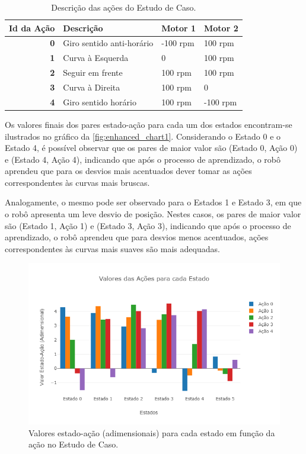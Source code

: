 \documentclass[a4paper]{ifacconf}
\begin{document}
\begin{table}
\centering
\ABNTEXfontereduzida
\caption{Descrição das ações do Estudo de Caso.} \label{tab:intermediateActionsTab}
\begin{tabular}{r|p{5cm}|p{2.0cm}|p{2.0cm}}
\textbf{Id da Ação} & Descrição & Motor 1 & Motor 2\\ \hline
\textbf{0} & Giro sentido anti-horário & -100 rpm & 100 rpm\\ \hline
\textbf{1} & Curva à Esquerda & 0 & 100 rpm\\ \hline
\textbf{2} & Seguir em frente & 100 rpm & 100 rpm \\ \hline
\textbf{3} & Curva à Direita & 100 rpm & 0\\ \hline
\textbf{4} & Giro sentido horário & 100 rpm & -100 rpm\\ \hline
\end{tabular}
\end{table}

Os valores finais dos pares estado-ação para cada um dos estados encontram-se ilustrados no gráfico da \autoref{fig:enhanced_chart1}. Considerando o Estado 0 e o Estado 4, é possível observar que os pares de maior valor são (Estado 0, Ação 0) e (Estado 4, Ação 4), indicando que após o processo de aprendizado, o robô aprendeu que para os desvios mais acentuados dever tomar as ações correspondentes às curvas mais bruscas. 

Analogamente, o mesmo pode ser observado para o Estados 1 e Estado 3, em que o robô apresenta um leve desvio de posição. Nestes casos, os pares de maior valor são (Estado 1, Ação 1) e (Estado 3, Ação 3), indicando que após o processo de aprendizado, o robô aprendeu que para desvios menos acentuados, ações correspondentes às curvas mais suaves são mais adequadas.

\begin{figure}
\centering 
\caption{Valores estado-ação (adimensionais) para cada estado em função da ação no Estudo de Caso.} \label{fig:enhanced_chart1}
\includegraphics[scale=0.38]{Figuras/enhanced_chart1.png}
\end{figure}
\end{document}
